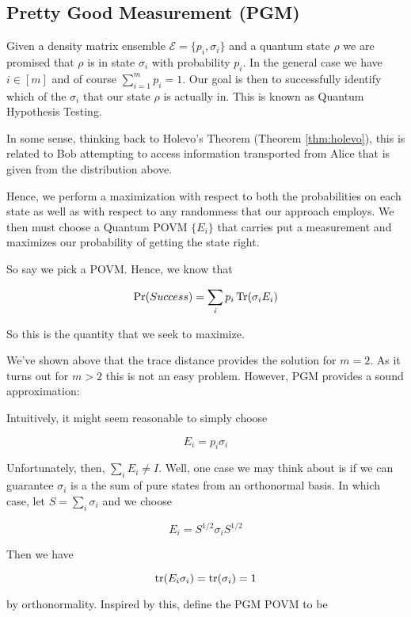 \documentclass[main.tex]{subfiles}
\begin{document}
\begin{subappendices}
\subsection{Pretty Good Measurement (PGM)}
\label{app:pgm}

Given a density matrix ensemble $\mathcal{E} = \{p_i, \sigma_i\}$ and a quantum state $\rho$ we are promised that $\rho$ is in state $\sigma_i$ with probability $p_i$. In the general case we have $i \in [m]$ and of course $\sum_{i=1}^m p_i = 1$. Our goal is then to successfully identify which of the $\sigma_i$ that our state $\rho$ is actually in. This is known as Quantum Hypothesis Testing. 

In some sense, thinking back to Holevo's Theorem (Theorem \ref{thm:holevo}), this is related to Bob attempting to access information transported from Alice that is given from the distribution above.

Hence, we perform a maximization with respect to both the probabilities on each state as well as with respect to any randomness that our approach employs. We then must choose a Quantum POVM $\{E_i\}$ that carries put a measurement and maximizes our probability of getting the state right.

So say we pick a POVM. Hence, we know that

\begin{align*}
\Pr(Success)= \sum_i p_i \Tr (\sigma_i E_i)
\end{align*}


So this is the quantity that we seek to maximize. 

We've shown above that the trace distance provides the solution for $m=2$. As it turns out for $m>2$ this is not an easy problem. However, PGM provides a sound approximation:

Intuitively, it might seem reasonable to simply choose 

$$E_i = p_i \sigma_i$$

Unfortunately, then, $\sum_i E_i \neq I$. Well, one case we may think about is if we can guarantee $\sigma_i$ is a the sum of pure states from an orthonormal basis. In which case, let $S = \sum_i \sigma_i$ and we choose 

$$E_i = S^{1/2} \sigma_i S^{1/2} $$ 

Then we have

$$
\tr(E_i \sigma_i) = \tr(\sigma_i) = 1
$$

by orthonormality. Inspired by this, define the PGM POVM to be 


\end{subappendices}
\end{document}
